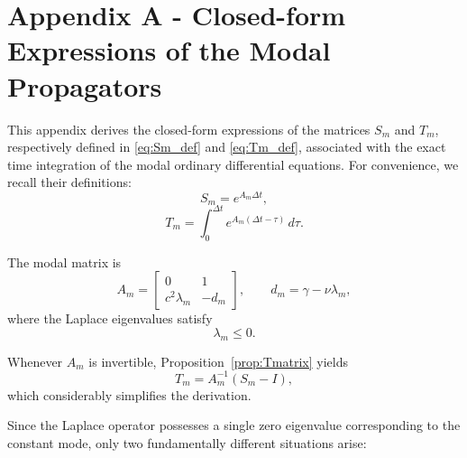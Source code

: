 \documentclass{Configuration_Files/PoliMi3i_thesis}
\begin{document}



\cleardoublepage
{} %
\appendix
\chapter{Appendix A - Closed-form Expressions of the Modal Propagators}
\label{app:A}

This appendix derives the closed-form expressions of the matrices \(S_m\) and \(T_m\), respectively defined in \eqref{eq:Sm_def} and \eqref{eq:Tm_def}, associated with the exact time integration of the modal ordinary differential equations. For convenience, we recall their definitions:
\begin{equation*}
S_m=e^{A_m\Delta t},
\end{equation*}
\begin{equation*}
T_m
=
\int_0^{\Delta t}
e^{A_m(\Delta t-\tau)}
\,d\tau.
\end{equation*}

The modal matrix is
\begin{equation*}
A_m=
\begin{bmatrix}
0 & 1\\
c^2\lambda_m & -d_m
\end{bmatrix},
\qquad
d_m=\gamma-\nu\lambda_m,
\end{equation*}
where the Laplace eigenvalues satisfy
\[
\lambda_m\le0.
\]

Whenever \(A_m\) is invertible, Proposition~\ref{prop:Tmatrix} yields
\begin{equation*}
T_m
=
A_m^{-1}(S_m-I),
\end{equation*}
which considerably simplifies the derivation.

Since the Laplace operator possesses a single zero eigenvalue corresponding to the constant mode, only two fundamentally different situations arise:
\end{document}
